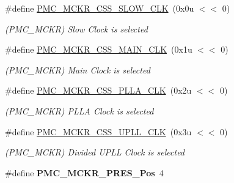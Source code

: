 \begin{DoxyCompactItemize}
\item 
\mbox{\label{group__SAMS70__PMC_gac30f30d82aa0a8e6ffd94e278d561b84}} 
\#define \mbox{\hyperlink{group__SAMS70__PMC_gac30f30d82aa0a8e6ffd94e278d561b84}{P\+M\+C\+\_\+\+M\+C\+K\+R\+\_\+\+C\+S\+S\+\_\+\+S\+L\+O\+W\+\_\+\+C\+LK}}~(0x0u $<$$<$ 0)
\begin{DoxyCompactList}\small\item\em (P\+M\+C\+\_\+\+M\+C\+KR) Slow Clock is selected \end{DoxyCompactList}\item 
\mbox{\label{group__SAMS70__PMC_ga1083253fbc37fcfcc9aa078dbc35f067}} 
\#define \mbox{\hyperlink{group__SAMS70__PMC_ga1083253fbc37fcfcc9aa078dbc35f067}{P\+M\+C\+\_\+\+M\+C\+K\+R\+\_\+\+C\+S\+S\+\_\+\+M\+A\+I\+N\+\_\+\+C\+LK}}~(0x1u $<$$<$ 0)
\begin{DoxyCompactList}\small\item\em (P\+M\+C\+\_\+\+M\+C\+KR) Main Clock is selected \end{DoxyCompactList}\item 
\mbox{\label{group__SAMS70__PMC_ga87abdef35a28f8c1adc1167682ad875f}} 
\#define \mbox{\hyperlink{group__SAMS70__PMC_ga87abdef35a28f8c1adc1167682ad875f}{P\+M\+C\+\_\+\+M\+C\+K\+R\+\_\+\+C\+S\+S\+\_\+\+P\+L\+L\+A\+\_\+\+C\+LK}}~(0x2u $<$$<$ 0)
\begin{DoxyCompactList}\small\item\em (P\+M\+C\+\_\+\+M\+C\+KR) P\+L\+LA Clock is selected \end{DoxyCompactList}\item 
\mbox{\label{group__SAMS70__PMC_ga53f178db8b1b9ca8eaac6e2475ff1ec2}} 
\#define \mbox{\hyperlink{group__SAMS70__PMC_ga53f178db8b1b9ca8eaac6e2475ff1ec2}{P\+M\+C\+\_\+\+M\+C\+K\+R\+\_\+\+C\+S\+S\+\_\+\+U\+P\+L\+L\+\_\+\+C\+LK}}~(0x3u $<$$<$ 0)
\begin{DoxyCompactList}\small\item\em (P\+M\+C\+\_\+\+M\+C\+KR) Divided U\+P\+LL Clock is selected \end{DoxyCompactList}\item 
\mbox{\label{group__SAMS70__PMC_ga28624e80bd61898c81fad61c5f9e5991}} 
\#define {\bfseries P\+M\+C\+\_\+\+M\+C\+K\+R\+\_\+\+P\+R\+E\+S\+\_\+\+Pos}~4

\end{DoxyCompactItemize}
